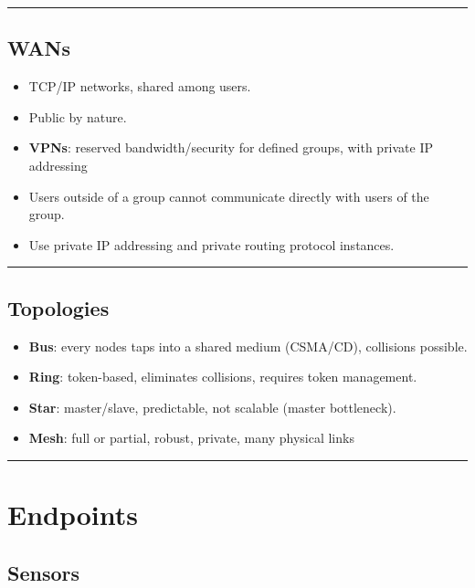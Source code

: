 \documentclass[
]{article}
\providecommand{\tightlist}{%
  \setlength{\itemsep}{0pt}\setlength{\parskip}{0pt}}
\begin{document}
\begin{center}\rule{0.5\linewidth}{0.5pt}\end{center}

\subsection{WANs}\label{wans}

\begin{itemize}
\tightlist
\item
  TCP/IP networks, shared among users.
\item
  Public by nature.
\item
  \textbf{VPNs}: reserved bandwidth/security for defined groups, with
  private IP addressing
\item
  Users outside of a group cannot communicate directly with users of the
  group.
\item
  Use private IP addressing and private routing protocol instances.
\end{itemize}

\begin{center}\rule{0.5\linewidth}{0.5pt}\end{center}

\subsection{Topologies}\label{topologies}

\begin{itemize}
\tightlist
\item
  \textbf{Bus}: every nodes taps into a shared medium (CSMA/CD),
  collisions possible.
\item
  \textbf{Ring}: token-based, eliminates collisions, requires token
  management.
\item
  \textbf{Star}: master/slave, predictable, not scalable (master
  bottleneck).
\item
  \textbf{Mesh}: full or partial, robust, private, many physical links
\end{itemize}

\begin{center}\rule{0.5\linewidth}{0.5pt}\end{center}

\section{Endpoints}\label{endpoints}

\subsection{Sensors}\label{sensors}
\end{document}
